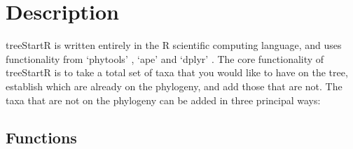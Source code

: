 \documentclass[11pt]{article}
\begin{document}
\section{Description}

treeStartR is written entirely in the R scientific computing language, and uses functionality from `phytools' \citep{phytools}, `ape' \citep{ape} and `dplyr' \citep{dplyr}.
The core functionality of treeStartR is to take a total set of taxa that you would like to have on the tree, establish which are already on the phylogeny, and add those that are not.
The taxa that are not on the phylogeny can be added in three principal ways: 

\subsection{Functions} 
\end{document}
